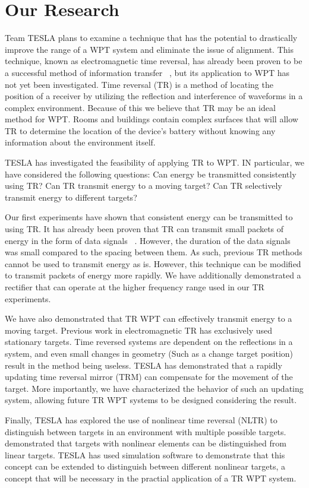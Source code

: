 \section{Our Research}
Team TESLA plans to examine a technique that has the potential to drastically improve the range of a WPT system and eliminate the issue of alignment. This technique, known as electromagnetic time reversal, has already been proven to be a successful method of information transfer ~\cite{nltr-wave-chaotic,cepni2005experimental}, but its application to WPT has not yet been investigated. Time reversal (TR) is a method of locating the position of a receiver by utilizing the reflection and interference of waveforms in a complex environment. Because of this we believe that TR may be an ideal method for WPT. Rooms and buildings contain complex surfaces that will allow TR to determine the location of the device's battery without knowing any information about the environment itself.

TESLA has investigated the feasibility of applying TR to WPT. IN particular, we have considered the following questions: Can energy be transmitted consistently using TR? Can TR transmit energy to a moving target? Can TR selectively transmit energy to different targets?

Our first experiments have shown that consistent energy  can be transmitted to using TR. It has already been proven that TR can transmit small packets of energy in the form of data signals ~\cite{nltr-wave-chaotic}. However, the duration of the data signals was small compared to the spacing between them. As such, previous TR methods cannot be used to transmit energy as is.  However, this technique can be modified to transmit packets of energy more rapidly.  We have additionally demonstrated a rectifier that can operate at the higher frequency range used in our TR experiments.

We have also demonstrated that TR WPT can effectively transmit energy to a moving target. Previous work in electromagnetic TR has exclusively used stationary targets. Time reversed systems are dependent on the reflections in a system, and even small changes in geometry (Such as a change target position) result in the method being useless.  TESLA has demonstrated that a rapidly updating time reversal mirror (TRM) can compensate for the movement of the target.  More importantly, we have characterized the behavior of such an updating system, allowing future TR WPT systems to be designed considering the result.

Finally, TESLA has explored the use of nonlinear time reversal (NLTR) to distinguish between targets in an environment with multiple possible targets. \cite{nltr-wave-chaotic} demonstrated that targets with nonlinear elements can be distinguished from linear targets.  TESLA has used simulation software to demonstrate that this concept can be extended to distinguish between different nonlinear targets, a concept that will be necessary in the practial application of a TR WPT system.
